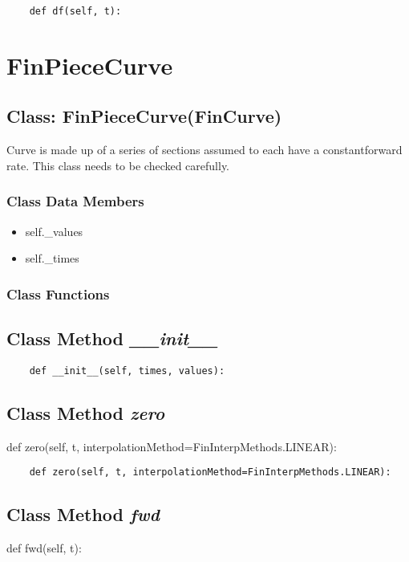 \documentclass[twoside,11pt]{book}
\begin{document}
\begin{lstlisting}
    def df(self, t):
\end{lstlisting}

\newpage
\section{FinPieceCurve}

\subsection{Class: FinPieceCurve(FinCurve)}
Curve is made up of a series of sections assumed to each have a constantforward rate. This class needs to be checked carefully. 

\subsubsection{Class Data Members}
\begin{itemize}
\item{self.\_values}
\item{self.\_times}
\end{itemize}

\subsubsection{Class Functions}

\subsection{Class Method {\it \_\_init\_\_}}


\begin{lstlisting}
    def __init__(self, times, values):
\end{lstlisting}

\subsection{Class Method {\it zero}}
def zero(self, t, interpolationMethod=FinInterpMethods.LINEAR):

\begin{lstlisting}
    def zero(self, t, interpolationMethod=FinInterpMethods.LINEAR):
\end{lstlisting}

\subsection{Class Method {\it fwd}}
def fwd(self, t):
\end{document}
